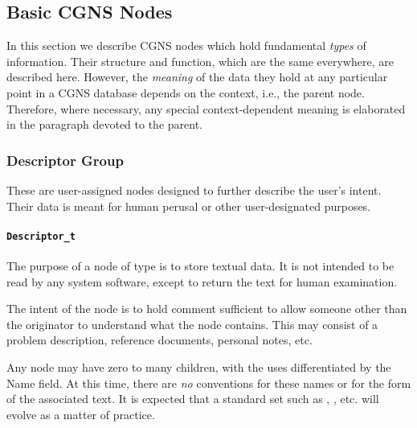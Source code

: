 \subsection{Basic CGNS Nodes}
\label{s:basicnodes}

In this section we describe CGNS nodes which hold fundamental
\emph{types} of information. Their structure and function, which are the
same everywhere, are described here. However, the \emph{meaning} of the
data they hold at any particular point in a CGNS database depends on the
context, i.e., the parent node. Therefore, where necessary, any special
context-dependent meaning is elaborated in the paragraph devoted to the
parent.

\subsubsection{Descriptor Group}

These are user-assigned nodes designed to further describe the user's
intent. Their data is meant for human perusal or other user-designated
purposes.

\paragraph{\texttt{Descriptor\_t}}

The purpose of a node of type  is to store textual
data. It is not intended to be read by any system software, except to
return the text for human examination.

The intent of the  node is to hold comment sufficient
to allow someone other than the originator to understand what the
node contains. This may consist of a problem description, reference
documents, personal notes, etc.

Any node may have zero to many  children, with
the uses differentiated by the Name field. At this time, there are \emph{no}
conventions for these names or for the form of the associated text. It
is expected that a standard set such as , ,
etc. will evolve as a matter of practice.

